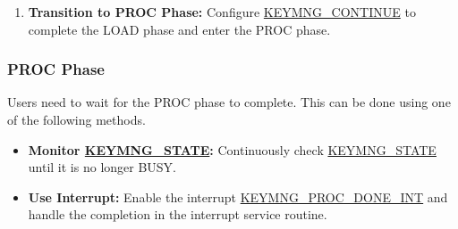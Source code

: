 \documentclass[main\_\_EN.tex]{subfiles}
\begin{document}
\begin{enumerate}
\begin{itemize}
\begin{enumerate}
            \item Write \begin{math}k2\_info\end{math} (512 bits) into \hyperref[mem:keymng-assist-info]{KEYMNG\_ASSIST\_INFO\_MEM}.
            \item Write \begin{math}k1*G\end{math} (512 bits) into \hyperref[mem:keymng-public-info]{KEYMNG\_PUBLIC\_INFO\_MEM}.
        \end{enumerate}
        \item \textbf{Private Key Recovery Mode:}
        \begin{enumerate}
            \item Write \hyperref[para:keyinfo]{\begin{math}key\_info\end{math}} (512 bits) into \hyperref[mem:keymng-assist-info]{KEYMNG\_ASSIST\_INFO\_MEM}.
        \end{enumerate}
        \item \textbf{\hyperref[para:keyinfo]{\begin{math}key\_info\end{math}} Export Mode:} No additional configuration is required.
    \end{itemize}
    \item \textbf{Transition to PROC Phase:}  Configure \hyperref[fielddesc:KEYMNGCONTINUE]{KEYMNG\_CONTINUE} to complete the LOAD phase and enter the PROC phase.
\end{enumerate}


\subsubsection{PROC Phase}
Users need to wait for the PROC phase to complete. This can be done using one of the following methods.
\begin{itemize}
    \item \textbf{Monitor \hyperref[fielddesc:KEYMNGSTATE]{KEYMNG\_STATE}:} Continuously check \hyperref[fielddesc:KEYMNGSTATE]{KEYMNG\_STATE} until it is no longer BUSY.
    \item \textbf{Use Interrupt:} Enable the interrupt \hyperref[int:KEYMNGPROCDONEINT]{KEYMNG\_PROC\_DONE\_INT} and handle the completion in the interrupt service routine.
\end{itemize}
\end{document}
